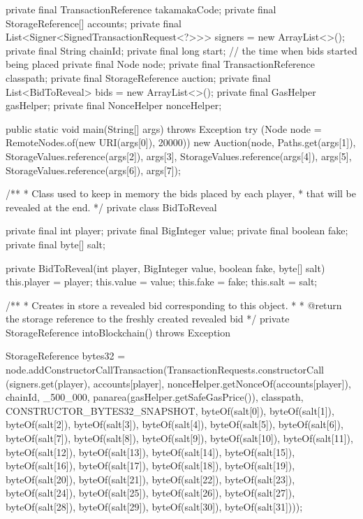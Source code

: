 \begin{codebox}
\begin{javalst}
{  private final TransactionReference takamakaCode;
  private final StorageReference[] accounts;
  private final List<Signer<SignedTransactionRequest<?>>> signers = new ArrayList<>();
  private final String chainId;
  private final long start;  // the time when bids started being placed
  private final Node node;
  private final TransactionReference classpath;
  private final StorageReference auction;
  private final List<BidToReveal> bids = new ArrayList<>();
  private final GasHelper gasHelper;
  private final NonceHelper nonceHelper;

  public static void main(String[] args) throws Exception {
	try (Node node = RemoteNodes.of(new URI(args[0]), 20000)) {
      new Auction(node, Paths.get(args[1]),
        StorageValues.reference(args[2]), args[3],
        StorageValues.reference(args[4]), args[5],
        StorageValues.reference(args[6]), args[7]);
    }
  }

  /**
  * Class used to keep in memory the bids placed by each player,
  * that will be revealed at the end.
  */
  private class BidToReveal {
    private final int player;
    private final BigInteger value;
    private final boolean fake;
    private final byte[] salt;

    private BidToReveal(int player, BigInteger value, boolean fake, byte[] salt) {
      this.player = player;
      this.value = value;
      this.fake = fake;
      this.salt = salt;
    }

    /**
    * Creates in store a revealed bid corresponding to this object.
    * 
    * @return the storage reference to the freshly created revealed bid
    */
    private StorageReference intoBlockchain() throws Exception {
      StorageReference bytes32 = node.addConstructorCallTransaction(TransactionRequests.constructorCall
        (signers.get(player), accounts[player],
        nonceHelper.getNonceOf(accounts[player]), chainId, _500_000,
        panarea(gasHelper.getSafeGasPrice()), classpath, CONSTRUCTOR_BYTES32_SNAPSHOT,
        byteOf(salt[0]), byteOf(salt[1]), byteOf(salt[2]), byteOf(salt[3]),
        byteOf(salt[4]), byteOf(salt[5]), byteOf(salt[6]), byteOf(salt[7]),
        byteOf(salt[8]), byteOf(salt[9]), byteOf(salt[10]), byteOf(salt[11]),
        byteOf(salt[12]), byteOf(salt[13]), byteOf(salt[14]), byteOf(salt[15]),
        byteOf(salt[16]), byteOf(salt[17]), byteOf(salt[18]), byteOf(salt[19]),
        byteOf(salt[20]), byteOf(salt[21]), byteOf(salt[22]), byteOf(salt[23]),
        byteOf(salt[24]), byteOf(salt[25]), byteOf(salt[26]), byteOf(salt[27]),
        byteOf(salt[28]), byteOf(salt[29]), byteOf(salt[30]), byteOf(salt[31])));

}}}
\end{javalst}
\end{codebox}
